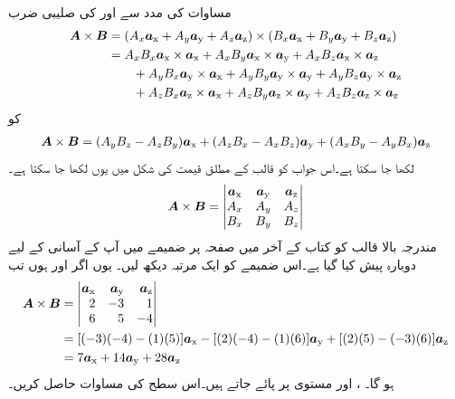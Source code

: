 مساوات  کی  مدد سے  اور  کی صلیبی ضرب
\begin{align*}
\kvec{A} \times \kvec{B}&=(A_x\ax+A_y\ay+A_z\az) \times (B_x\ax+B_y\ay+B_z\az)\\
&=A_x B_x \ax \times \ax+A_x B_y \ax \times \ay+A_x B_z \ax \times \az\\
& \quad \quad +A_y B_x \ay \times \ax+A_y B_y \ay \times \ay+A_y B_z \ay \times \az \\
&\quad \quad +A_z B_x \az \times \ax+A_z B_y \az \times \ay+A_z B_z \az \times \az
\end{align*}
کو
\begin{align}
\kvec{A} \times \kvec{B}=(A_y B_z-A_z B_y)\ax+(A_z B_x-A_x B_z)\ay+(A_x B_y-A_y B_x)\az
\end{align}
لکھا جا سکتا ہے۔اس جواب کو قالب کے مطلق قیمت کی شکل میں یوں لکھا جا سکتا ہے۔
\begin{align}\label{مساوات_سمتیات_سمتی_ضرب_قالب_شکل}
\kvec{A} \times \kvec{B}=\begin{vmatrix}
\ax & \ay & \az\\
A_x & A_y & A_z\\
B_x & B_y & B_z
\end{vmatrix}
\end{align}
مندرجہ بالا قالب کو کتاب کے آخر میں صفحہ  پر ضمیمے میں آپ کے آسانی کے لیے دوبارہ پیش کیا گیا ہے۔اس ضمیمے کو ایک مرتبہ دیکھ لیں۔
یوں اگر  اور  ہوں تب
\begin{align*}
\kvec{A} \times \kvec{B}&=\begin{vmatrix*}[r]
\ax & \ay & \az\\
2 & -3 & 1\\
6 & 5 & -4
\end{vmatrix*}\\
&=[(-3)(-4)-(1)(5)]\ax-[(2)(-4)-(1)(6)]\ay+[(2)(5)-(-3)(6)]\az\\
&=7\ax+14\ay+28\az
\end{align*}
ہو گا۔
،  اور  مستوی پر پائے جاتے ہیں۔اس سطح کی مساوات حاصل کریں۔

